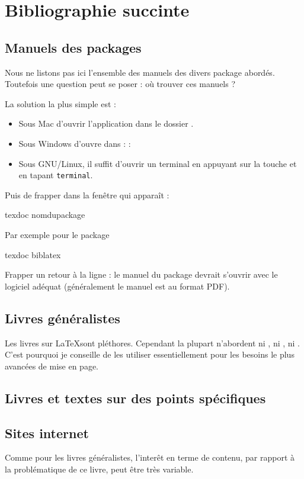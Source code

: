 \chapter{Bibliographie succinte}

\nocite{*}
\section{Manuels des packages \label{manuels}}


Nous ne listons pas ici l'ensemble des manuels des divers package abordés. Toutefois une question peut se poser : où trouver ces manuels ?

La solution la plus simple est :
\begin{itemize}
\item Sous Mac d'ouvrir l'application  dans le dossier .
\item Sous Windows d'ouvre  dans  :  : 
\item Sous GNU/Linux, il suffit d'ouvrir un  terminal en appuyant sur la touche  et en tapant \verb|terminal|.
\end{itemize}

Puis de frapper dans la fenêtre qui apparaît :

\begin{bashcode}
texdoc nomdupackage
\end{bashcode}

Par exemple pour le package 

\begin{bashcode}
texdoc biblatex
\end{bashcode}

Frapper un retour à la ligne : le manuel du package devrait s'ouvrir avec le logiciel adéquat (généralement le manuel est au format PDF).

\section{Livres généralistes}

Les livres sur \LaTeX sont pléthores. Cependant la plupart n'abordent ni \XeLaTeX, ni , ni . C'est pourquoi je conseille de les utiliser essentiellement pour les besoins le plus avancées de mise en page.

\printbibliography[keyword=generaliste]

\section{Livres et textes sur des points spécifiques}

\printbibliography[keyword=specifique]


\section{Sites internet}

Comme pour les livres généralistes,  l'interêt en terme de contenu, par rapport à la problématique de ce livre, peut être très variable. 

\printbibliography[keyword=site]
